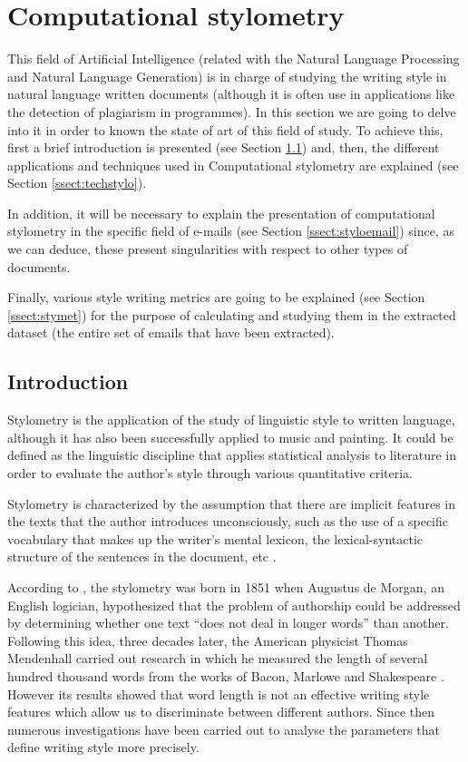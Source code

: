 \section{Computational stylometry}
This field of Artificial Intelligence (related with the Natural Language Processing and Natural Language Generation) is in charge of studying the writing style in natural language written documents (although it is often use in applications like the detection of plagiarism in programmes). In this section we are going to delve into it in order to known the state of art of this field of study. To achieve this, first a brief introduction is presented (see Section \ref{ssect:introstylo}) and, then, the different applications and techniques used in Computational stylometry are explained (see Section \ref{ssect:techstylo}).

In addition, it will be necessary to explain the presentation of computational stylometry in the specific field of e-mails (see Section \ref{ssect:styloemail}) since, as we can deduce, these present singularities with respect to other types of documents.

Finally, various style writing metrics are going to be explained (see Section \ref{ssect:stymet}) for the purpose of calculating and studying them in the extracted dataset (the entire set of emails that have been extracted).

\subsection{Introduction}\label{ssect:introstylo}
Stylometry \citep{wiki:stylometry} is the application of the study of linguistic style to written language, although it has also been successfully applied to music and painting. It could be defined as the linguistic discipline that applies statistical analysis to literature in order to evaluate the author's style through various quantitative criteria.

Stylometry is characterized by the assumption that there are implicit features in the texts that the author introduces unconsciously, such as the use of a specific vocabulary that makes up the writer's mental lexicon, the lexical-syntactic structure of the sentences in the document, etc \citep{burrows1992computers}.

According to \cite{stylohist}, the stylometry was born in 1851 when Augustus de Morgan, an English logician, hypothesized that the problem of authorship could be addressed by determining whether one text ``does not deal in longer words'' \citep{morganletters} than another. Following this idea, three decades later, the American physicist Thomas Mendenhall carried out research in which he measured the length of several hundred thousand words from the works of Bacon, Marlowe and Shakespeare \citep{mendenhall1887}. However its results showed that word length is not an effective writing style features which allow us to discriminate between different authors. Since then numerous investigations have been carried out to analyse the parameters that define writing style more precisely.

